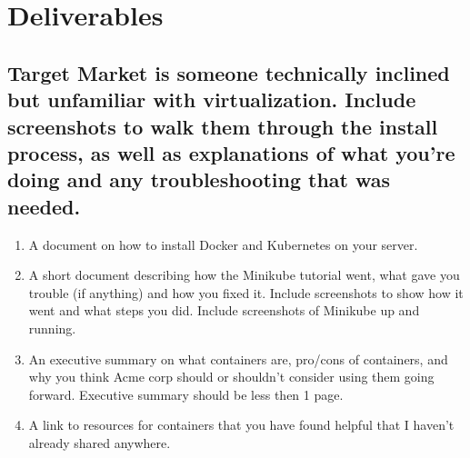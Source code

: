 \documentclass[12pt]{article}
\begin{document}
\section*{Deliverables}
\subsection*{Target Market is someone technically inclined but unfamiliar with virtualization. Include screenshots to walk them through the install process, as well as explanations of what you're doing and any troubleshooting that was needed.}
\begin{enumerate}
    \item A document on how to install Docker and Kubernetes on your server.
    \item A short document describing how the Minikube tutorial went, what gave you trouble (if anything) and how you fixed it. Include screenshots to show how it went and what steps you did. Include screenshots of Minikube up and running. 
    \item An executive summary on what containers are, pro/cons of containers, and why you think Acme corp should or shouldn't consider using them going forward.  Executive summary should be less then 1 page. 
    \item A link to resources for containers that you have found helpful that I haven't already shared anywhere.
\end{enumerate}
\end{document}
